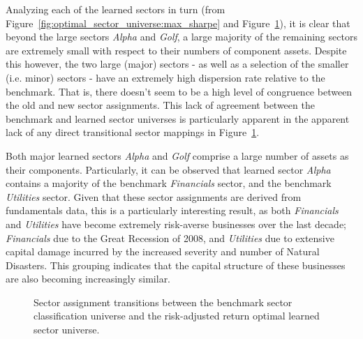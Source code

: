 \documentclass[../main.tex]{subfiles}
\begin{document}
Analyzing each of the learned sectors in turn (from Figure~\ref{fig:optimal_sector_universe:max_sharpe} and Figure~\ref{fig:benchmark_comparison:ls_optimal_assets}), it is clear that beyond the large sectors \textit{Alpha} and \textit{Golf}, a large majority of the remaining sectors are extremely small with respect to their numbers of component assets. Despite this however, the two large (major) sectors - as well as a selection of the smaller (i.e. minor) sectors - have an extremely high dispersion rate relative to the benchmark. That is, there doesn't seem to be a high level of congruence between the old and new sector assignments. This lack of agreement between the benchmark and learned sector universes is particularly apparent in the apparent lack of any direct transitional sector mappings in Figure~\ref{fig:benchmark_comparison:ls_optimal_assets}.

\pagebreak

Both major learned sectors \textit{Alpha} and \textit{Golf} comprise a large number of assets as their components. Particularly, it can be observed that learned sector \textit{Alpha} contains a majority of the benchmark \textit{Financials} sector, and the benchmark \textit{Utilities} sector. Given that these sector assignments are derived from fundamentals data, this is a particularly interesting result, as both \textit{Financials} and \textit{Utilities} have become extremely risk-averse businesses over the last decade; \textit{Financials} due to the Great Recession of 2008, and \textit{Utilities} due to extensive capital damage incurred by the increased severity and number of Natural Disasters. This grouping indicates that the capital structure of these businesses are also becoming increasingly similar.

\begin{figure}[!h]
    \centering
    \caption{Sector assignment transitions between the benchmark sector classification universe and the risk-adjusted return optimal learned sector universe.}
    \label{fig:benchmark_comparison:ls_optimal_assets}
\end{figure}
\end{document}
